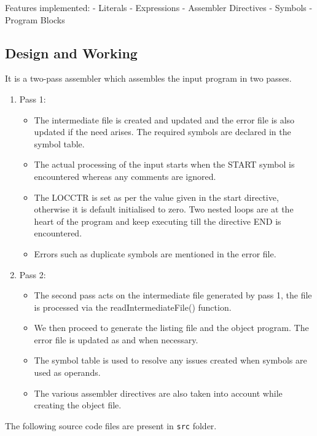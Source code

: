 \documentclass[
]{article}
\providecommand{\tightlist}{%
  \setlength{\itemsep}{0pt}\setlength{\parskip}{0pt}}
\begin{document}
Features implemented: - Literals - Expressions - Assembler Directives -
Symbols - Program Blocks

\subsection{Design and Working}\label{design-and-working}

It is a two-pass assembler which assembles the input program in two
passes.

\begin{enumerate}
\def\labelenumi{\arabic{enumi})}
\item
  Pass 1:

  \begin{itemize}
  \tightlist
  \item
    The intermediate file is created and updated and the error file is
    also updated if the need arises. The required symbols are declared
    in the symbol table.
  \item
    The actual processing of the input starts when the START symbol is
    encountered whereas any comments are ignored.
  \item
    The LOCCTR is set as per the value given in the start directive,
    otherwise it is default initialised to zero. Two nested loops are at
    the heart of the program and keep executing till the directive END
    is encountered.
  \item
    Errors such as duplicate symbols are mentioned in the error file.
  \end{itemize}
\item
  Pass 2:

  \begin{itemize}
  \tightlist
  \item
    The second pass acts on the intermediate file generated by pass 1,
    the file is processed via the readIntermediateFile() function.
  \item
    We then proceed to generate the listing file and the object program.
    The error file is updated as and when necessary.
  \item
    The symbol table is used to resolve any issues created when symbols
    are used as operands.
  \item
    The various assembler directives are also taken into account while
    creating the object file.
  \end{itemize}
\end{enumerate}

The following source code files are present in \texttt{src} folder.
\end{document}
